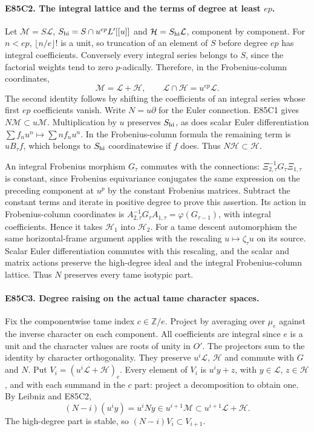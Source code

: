 \paragraph{E85C2. The integral lattice and the terms of degree at least $ep$.}
Let $\mathcal M=S\mathcal L$, $S_{\rm hi}=S\cap u^{ep}L'[[u]]$ and
$\mathcal H=S_{\rm hi}\mathcal L$, component by component. For
$n<ep$, $\lfloor n/e\rfloor!$ is a unit, so truncation of an element
of $S$ before degree $ep$ has integral coefficients. Conversely every
integral series belongs to $S$, since the factorial weights tend to
zero $p$-adically. Therefore, in the Frobenius-column coordinates,
\[
 \mathcal M=\mathcal L+\mathcal H,\qquad
 \mathcal L\cap\mathcal H=u^{ep}\mathcal L.
\]
The second identity follows by shifting the coefficients of an
integral series whose first $ep$ coefficients vanish.
Write $N=u\partial$ for the Euler connection. E85C1 gives
$N\mathcal M\subset u\mathcal M$. Multiplication by $u$ preserves
$S_{\rm hi}$, as does scalar Euler differentiation
$\sum f_nu^n\mapsto\sum nf_nu^n$. In the Frobenius-column formula
the remaining term is $uB_\tau f$, which belongs to $S_{\rm hi}$
coordinatewise if $f$ does. Thus $N\mathcal H\subset\mathcal H$.

An integral Frobenius morphism $G_\tau$ commutes with the connections:
$\Xi_{2,\tau}^{-1}G_\tau\Xi_{1,\tau}$ is constant, since Frobenius
equivariance conjugates the same expression on the preceding
component at $u^p$ by the constant Frobenius matrices. Subtract the
constant terms and iterate in positive degree to prove this assertion.
Its action in Frobenius-column coordinates is
$A_{2,\tau}^{-1}G_\tau A_{1,\tau}=\varphi(G_{\tau-1})$, with integral
coefficients. Hence it takes $\mathcal H_1$ into $\mathcal H_2$.
For a tame descent automorphism the same horizontal-frame argument
applies with the rescaling $u\mapsto\zeta_\tau u$ on its source.
Scalar Euler differentiation commutes with this rescaling, and
the scalar and matrix actions preserve the high-degree ideal and
the integral Frobenius-column lattice. Thus $N$ preserves every
tame isotypic part.

\paragraph{E85C3. Degree raising on the actual tame character spaces.}
Fix the componentwise tame index $c\in\mathbb Z/e$. Project by
averaging over $\mu_e$ against the inverse character on each
component. All coefficients are integral since $e$ is a unit and
the character values are roots of unity in $O'$. The projectors
sum to the identity by character orthogonality. They preserve
$u^i\mathcal L$, $\mathcal H$ and commute with $G$ and $N$.
Put $V_i=(u^i\mathcal L+\mathcal H)_c$. Every element of $V_i$ is
$u^iy+z$, with $y\in\mathcal L$, $z\in\mathcal H$, and with each
summand in the $c$ part: project a decomposition to obtain one.
By Leibniz and E85C2,
\[
 (N-i)(u^iy)=u^iNy\in u^{i+1}\mathcal M
       \subset u^{i+1}\mathcal L+\mathcal H .
\]
The high-degree part is stable, so $(N-i)V_i\subset V_{i+1}$.

